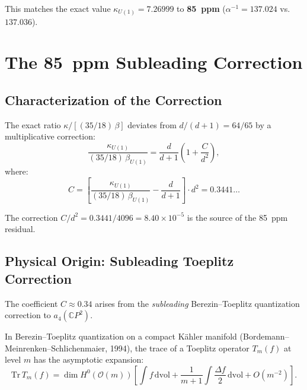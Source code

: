 \documentclass[12pt,a4paper]{article}
\theoremstyle{definition}
\theoremstyle{remark}
\begin{document}
This matches the exact value $\kappa_{U(1)} = 7.26999$ to
\textbf{85~ppm} ($\alpha^{-1} = 137.024$ vs.\ $137.036$).

\section{The 85~ppm Subleading Correction}
\label{sec:85ppm}

\subsection{Characterization of the Correction}

The exact ratio $\kappa/[(35/18)\,\beta]$ deviates from $d/(d+1) = 64/65$
by a multiplicative correction:
\begin{equation}
\frac{\kappa_{U(1)}}{(35/18)\,\beta_{U(1)}}
= \frac{d}{d+1}\left(1 + \frac{C}{d^2}\right),
\end{equation}
where:
\begin{equation}\label{eq:C-coefficient}
\boxed{
C = \left[\frac{\kappa_{U(1)}}{(35/18)\,\beta_{U(1)}}
- \frac{d}{d+1}\right] \cdot d^2
= 0.3441\ldots
}
\end{equation}

The correction $C/d^2 = 0.3441/4096 = 8.40 \times 10^{-5}$ is the
source of the 85~ppm residual.

\subsection{Physical Origin: Subleading Toeplitz Correction}

The coefficient $C \approx 0.34$ arises from the \emph{subleading}
Berezin--Toeplitz quantization correction to $a_4(\mathbb{C}P^2)$.

In Berezin--Toeplitz quantization on a compact K\"ahler manifold
(Bordemann--Meinrenken--Schlichenmaier, 1994), the trace of a Toeplitz
operator $T_m(f)$ at level $m$ has the asymptotic expansion:
\begin{equation}
\mathrm{Tr}\,T_m(f) = \dim H^0(\mathcal{O}(m))
\left[\int f\,\mathrm{dvol}
+ \frac{1}{m+1}\int \frac{\Delta f}{2}\,\mathrm{dvol}
+ O(m^{-2})\right].
\end{equation}
\end{document}
